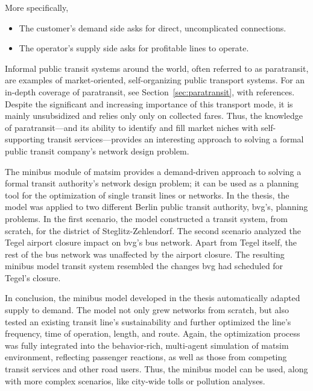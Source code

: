 More specifically,
\begin{itemize}\styleItemize
\item The customer's demand side asks for direct, uncomplicated connections.
\item The operator's supply side asks for profitable lines to operate.
\end{itemize}
Informal public transit systems around the world, often referred to as paratransit, are examples of market-oriented, self-organizing public transport systems. For an in-depth coverage of paratransit, see Section~\ref{sec:paratransit}, with references. Despite the significant and increasing importance of this transport mode, it is mainly unsubsidized and relies only only on collected fares. Thus, the knowledge of paratransit---and its ability to identify and fill market niches with self-supporting transit services---provides an interesting approach to solving a formal public transit company's network design problem.

\noindent
The minibus module of \gls{matsim} provides a demand-driven approach to solving a formal transit authority's network design problem; it can be used as a planning tool for the optimization of single transit lines or networks. In the \citet[][]{Neumann2014PhD} thesis, the model was applied to two different Berlin public transit authority, \gls{bvg}'s, planning problems. In the first scenario, the model constructed a transit system, from scratch, for the district of Steglitz-Zehlendorf. The second scenario analyzed the Tegel airport closure impact on \gls{bvg}'s bus network. Apart from Tegel itself, the rest of the bus network was unaffected by the airport closure. The resulting minibus model transit system resembled the changes \gls{bvg} had scheduled for Tegel's closure.

In conclusion, the minibus model developed in the thesis automatically adapted supply to demand. The model not only grew networks from scratch, but also tested an existing transit line's sustainability and  further optimized the line's frequency, time of operation, length, and route. Again, the optimization process was fully integrated into the behavior-rich, multi-agent simulation of \gls{matsim} environment, reflecting passenger reactions, as well as those from competing transit services and other road users. Thus, the minibus model can be used, along with more complex scenarios, like city-wide tolls or pollution analyses.

